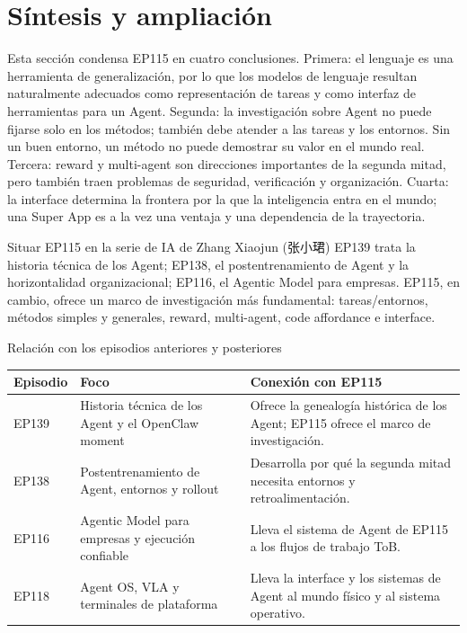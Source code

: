 \section{Síntesis y ampliación}

Esta sección condensa EP115 en cuatro conclusiones. Primera: el lenguaje es una herramienta de generalización, por lo que los modelos de lenguaje resultan naturalmente adecuados como representación de tareas y como interfaz de herramientas para un Agent. Segunda: la investigación sobre Agent no puede fijarse solo en los métodos; también debe atender a las tareas y los entornos. Sin un buen entorno, un método no puede demostrar su valor en el mundo real. Tercera: reward y multi-agent son direcciones importantes de la segunda mitad, pero también traen problemas de seguridad, verificación y organización. Cuarta: la interface determina la frontera por la que la inteligencia entra en el mundo; una Super App es a la vez una ventaja y una dependencia de la trayectoria.

\begin{importantbox}{Situar EP115 en la serie de IA de Zhang Xiaojun (张小珺)}
EP139 trata la historia técnica de los Agent; EP138, el postentrenamiento de Agent y la horizontalidad organizacional; EP116, el Agentic Model para empresas. EP115, en cambio, ofrece un marco de investigación más fundamental: tareas/entornos, métodos simples y generales, reward, multi-agent, code affordance e interface.
\end{importantbox}

\begin{knowledgebox}{Relación con los episodios anteriores y posteriores}
\begin{tabularx}{\textwidth}{p{}p{}X}
\toprule
Episodio & Foco & Conexión con EP115 \\
\midrule
EP139 & Historia técnica de los Agent y el OpenClaw moment & Ofrece la genealogía histórica de los Agent; EP115 ofrece el marco de investigación. \\
EP138 & Postentrenamiento de Agent, entornos y rollout & Desarrolla por qué la segunda mitad necesita entornos y retroalimentación. \\
EP116 & Agentic Model para empresas y ejecución confiable & Lleva el sistema de Agent de EP115 a los flujos de trabajo ToB. \\
EP118 & Agent OS, VLA y terminales de plataforma & Lleva la interface y los sistemas de Agent al mundo físico y al sistema operativo. \\
\bottomrule
\end{tabularx}
\end{knowledgebox}

